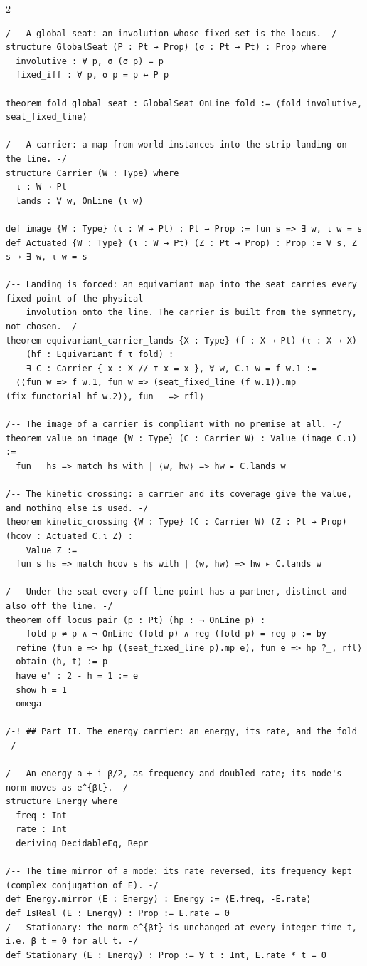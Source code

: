 \documentclass[10pt]{article}
\begin{document}
\begin{multicols}{2}
\begin{Verbatim}[fontsize=\fontsize{6.2}{7.2}\selectfont,breaklines,breakanywhere,breaksymbolleft={}]
/-- A global seat: an involution whose fixed set is the locus. -/
structure GlobalSeat (P : Pt → Prop) (σ : Pt → Pt) : Prop where
  involutive : ∀ p, σ (σ p) = p
  fixed_iff : ∀ p, σ p = p ↔ P p

theorem fold_global_seat : GlobalSeat OnLine fold := ⟨fold_involutive, seat_fixed_line⟩

/-- A carrier: a map from world-instances into the strip landing on the line. -/
structure Carrier (W : Type) where
  ι : W → Pt
  lands : ∀ w, OnLine (ι w)

def image {W : Type} (ι : W → Pt) : Pt → Prop := fun s => ∃ w, ι w = s
def Actuated {W : Type} (ι : W → Pt) (Z : Pt → Prop) : Prop := ∀ s, Z s → ∃ w, ι w = s

/-- Landing is forced: an equivariant map into the seat carries every fixed point of the physical
    involution onto the line. The carrier is built from the symmetry, not chosen. -/
theorem equivariant_carrier_lands {X : Type} (f : X → Pt) (τ : X → X)
    (hf : Equivariant f τ fold) :
    ∃ C : Carrier { x : X // τ x = x }, ∀ w, C.ι w = f w.1 :=
  ⟨⟨fun w => f w.1, fun w => (seat_fixed_line (f w.1)).mp (fix_functorial hf w.2)⟩, fun _ => rfl⟩

/-- The image of a carrier is compliant with no premise at all. -/
theorem value_on_image {W : Type} (C : Carrier W) : Value (image C.ι) :=
  fun _ hs => match hs with | ⟨w, hw⟩ => hw ▸ C.lands w

/-- The kinetic crossing: a carrier and its coverage give the value, and nothing else is used. -/
theorem kinetic_crossing {W : Type} (C : Carrier W) (Z : Pt → Prop) (hcov : Actuated C.ι Z) :
    Value Z :=
  fun s hs => match hcov s hs with | ⟨w, hw⟩ => hw ▸ C.lands w

/-- Under the seat every off-line point has a partner, distinct and also off the line. -/
theorem off_locus_pair (p : Pt) (hp : ¬ OnLine p) :
    fold p ≠ p ∧ ¬ OnLine (fold p) ∧ reg (fold p) = reg p := by
  refine ⟨fun e => hp ((seat_fixed_line p).mp e), fun e => hp ?_, rfl⟩
  obtain ⟨h, t⟩ := p
  have e' : 2 - h = 1 := e
  show h = 1
  omega

/-! ## Part II. The energy carrier: an energy, its rate, and the fold -/

/-- An energy a + i β/2, as frequency and doubled rate; its mode's norm moves as e^{βt}. -/
structure Energy where
  freq : Int
  rate : Int
  deriving DecidableEq, Repr

/-- The time mirror of a mode: its rate reversed, its frequency kept (complex conjugation of E). -/
def Energy.mirror (E : Energy) : Energy := ⟨E.freq, -E.rate⟩
def IsReal (E : Energy) : Prop := E.rate = 0
/-- Stationary: the norm e^{βt} is unchanged at every integer time t, i.e. β t = 0 for all t. -/
def Stationary (E : Energy) : Prop := ∀ t : Int, E.rate * t = 0


\end{Verbatim}
\end{multicols}
\end{document}
